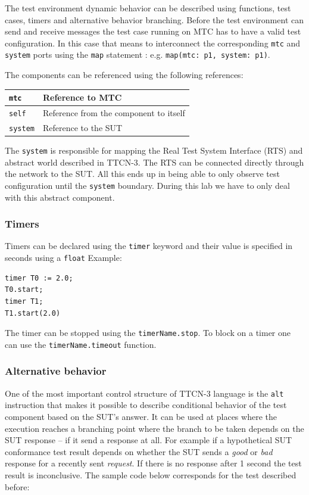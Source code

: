 \documentclass[a4paper]{article}
\begin{document}
The test environment dynamic behavior can be described using functions, test cases, timers and alternative behavior
branching. Before the test environment can send and receive messages the test case running on MTC has to have a valid
test configuration. In this case that means to interconnect the corresponding \verb!mtc! and
\verb!system! ports using the \verb/map/ statement : e.g.
\verb!map(mtc: p1, system: p1)!.

The components can be referenced using the following references:

{\footnotesize
\begin{tabular}{|l|p{11cm}|}
    \hline
    \verb/mtc/ & Reference to MTC                        \\
    \hline
    \verb/self/ & Reference from the component to itself  \\
    \hline
    \verb/system/ & Reference to the SUT                    \\
    \hline
\end{tabular}
}

The \verb/system/ is responsible for mapping the Real Test System Interface (RTS) and abstract world
described in TTCN-3.
The RTS can be connected directly through the network to the SUT.
All this ends up in being able to only observe test configuration until the \verb/system/ boundary.
During this lab we have to only deal with this abstract component.

\subsubsection{Timers}
Timers can be declared using the \verb/timer/ keyword and their value is specified in seconds using a
\verb.float. Example:
{\footnotesize
\begin{lstlisting}
timer T0 := 2.0;
T0.start;
timer T1;
T1.start(2.0)
\end{lstlisting}
}

The timer can be stopped using the \verb/timerName.stop/.
To block on a timer one can use the \verb!timerName.timeout! function.

\subsubsection{Alternative behavior}

One of the most important control structure of TTCN-3 language is the \verb.alt. instruction that
makes it possible to describe conditional behavior of the test component based on the SUT's answer.
It can be used at places where the execution reaches a branching point where the branch to be taken depends on the SUT
response -- if it send a response at all.
For example if a hypothetical SUT conformance test result depends on whether the SUT sends a \textit{good} or
\textit{bad} response for a recently sent \textit{request}. If there is no response after 1 second the test result is
inconclusive. The sample code below corresponds for the test described before:
\end{document}
